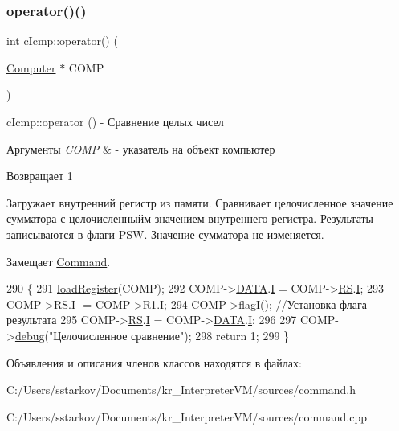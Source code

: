 \subsubsection{\texorpdfstring{operator()()}{operator()()}}
{\footnotesize\ttfamily int c\+Icmp\+::operator() (\begin{DoxyParamCaption}\item[{\hyperlink{class_computer}{Computer} $\ast$}]{C\+O\+MP }\end{DoxyParamCaption})\hspace{0.3cm}{\ttfamily [virtual]}}



c\+Icmp\+::operator () -\/ Сравнение целых чисел 


\begin{DoxyParams}{Аргументы}
{\em C\+O\+MP} & -\/ указатель на объект компьютер \\
\hline
\end{DoxyParams}
\begin{DoxyReturn}{Возвращает}
1
\end{DoxyReturn}
Загружает внутренний регистр из памяти. Сравнивает целочисленное значение сумматора с целочисленныйм значением внутреннего регистра. Результаты записываются в флаги P\+SW. Значение сумматора не изменяется. 

Замещает \hyperlink{class_command_a79939b66f3de892e91d7710844294716}{Command}.


\begin{DoxyCode}
290 \{
291     \hyperlink{class_command_aac6f368e7c9dbb357b3f00627d5dabfc}{loadRegister}(COMP);
292     COMP->\hyperlink{class_computer_adb154047da2156e4419af3b3a4a766b7}{DATA}.\hyperlink{union_computer_1_1data_a6e51de6e0351adc4e50b336a092bc4bb}{I} = COMP->\hyperlink{class_computer_a874503110664b3cf821118d2ce9c2b96}{RS}.\hyperlink{union_computer_1_1data_a6e51de6e0351adc4e50b336a092bc4bb}{I};
293     COMP->\hyperlink{class_computer_a874503110664b3cf821118d2ce9c2b96}{RS}.\hyperlink{union_computer_1_1data_a6e51de6e0351adc4e50b336a092bc4bb}{I} -= COMP->\hyperlink{class_computer_a0fbf84599b7db9d634a92afed443ee73}{R1}.\hyperlink{union_computer_1_1data_a6e51de6e0351adc4e50b336a092bc4bb}{I};
294     COMP->\hyperlink{class_computer_aae4a76a8a03a6c9fb1c12968d629be3e}{flagI}(); \textcolor{comment}{//Установка флага результата}
295     COMP->\hyperlink{class_computer_a874503110664b3cf821118d2ce9c2b96}{RS}.\hyperlink{union_computer_1_1data_a6e51de6e0351adc4e50b336a092bc4bb}{I} = COMP->\hyperlink{class_computer_adb154047da2156e4419af3b3a4a766b7}{DATA}.\hyperlink{union_computer_1_1data_a6e51de6e0351adc4e50b336a092bc4bb}{I};
296 
297     COMP->\hyperlink{class_computer_a10ca6c6b200630119201de16d7368e0f}{debug}(\textcolor{stringliteral}{"Целочисленное сравнение"});
298     \textcolor{keywordflow}{return} 1;
299 \}
\end{DoxyCode}


Объявления и описания членов классов находятся в файлах\+:\begin{DoxyCompactItemize}
\item 
C\+:/\+Users/sstarkov/\+Documents/kr\+\_\+\+Interpreter\+V\+M/sources/command.\+h\item 
C\+:/\+Users/sstarkov/\+Documents/kr\+\_\+\+Interpreter\+V\+M/sources/command.\+cpp\end{DoxyCompactItemize}
